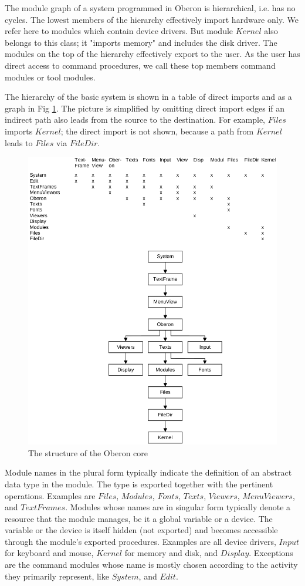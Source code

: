 The module graph of a system programmed in Oberon is hierarchical, i.e. has no cycles. The
lowest members of the hierarchy effectively import hardware only. We refer here to modules which
contain device drivers. But module $Kernel$ also belongs to this class; it "imports memory" and
includes the disk driver. The modules on the top of the hierarchy effectively export to the user. As
the user has direct access to command procedures, we call these top members command modules or tool modules.

The hierarchy of the basic system is shown in a table of direct imports and as a graph in Fig \ref{fig:structure}.
The picture is simplified by omitting direct import edges if an indirect path also leads from the
source to the destination. For example, $Files$ imports $Kernel$; the direct import is not shown,
because a path from $Kernel$ leads to $Files$ via $FileDir$.
\begin{figure}
  \centering
  \includegraphics[width=.95\textwidth]{i/2.png}
  \caption{The structure of the Oberon core}
  \label{fig:structure}
\end{figure}

Module names in the plural form typically indicate the definition of an abstract data type in the module.
The type is exported together with the pertinent operations. Examples are $Files$, $Modules$, $Fonts$,
$Texts$, $Viewers$, $MenuViewers$, and $TextFrames$. Modules whose names are in singular form
typically denote a resource that the module manages, be it a global variable or a device. The
variable or the device is itself hidden (not exported) and becomes accessible through the module's
exported procedures. Examples are all device drivers, $Input$ for keyboard and mouse, $Kernel$ for
memory and disk, and $Display$. Exceptions are the command modules whose name is mostly
chosen according to the activity they primarily represent, like $System$, and $Edit$.


